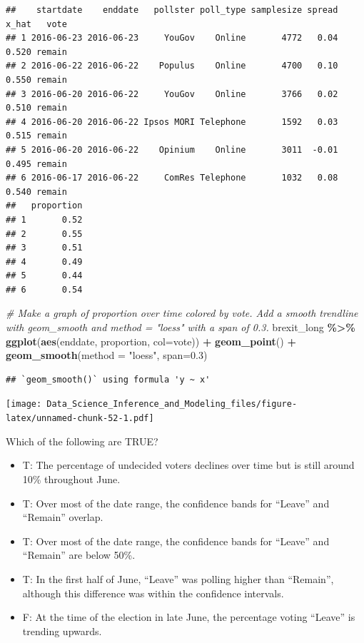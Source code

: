 \documentclass[
]{article}
\newenvironment{Shaded}{\begin{snugshade}}{\end{snugshade}}
\newcommand{\CommentTok}[1]{\textcolor[rgb]{0.56,0.35,0.01}{\textit{#1}}}
\newcommand{\DataTypeTok}[1]{\textcolor[rgb]{0.13,0.29,0.53}{#1}}
\newcommand{\FloatTok}[1]{\textcolor[rgb]{0.00,0.00,0.81}{#1}}
\newcommand{\KeywordTok}[1]{\textcolor[rgb]{0.13,0.29,0.53}{\textbf{#1}}}
\newcommand{\NormalTok}[1]{#1}
\newcommand{\OperatorTok}[1]{\textcolor[rgb]{0.81,0.36,0.00}{\textbf{#1}}}
\newcommand{\StringTok}[1]{\textcolor[rgb]{0.31,0.60,0.02}{#1}}
\providecommand{\tightlist}{%
  \setlength{\itemsep}{0pt}\setlength{\parskip}{0pt}}
\begin{document}
\begin{verbatim}
##    startdate    enddate   pollster poll_type samplesize spread x_hat   vote
## 1 2016-06-23 2016-06-23     YouGov    Online       4772   0.04 0.520 remain
## 2 2016-06-22 2016-06-22    Populus    Online       4700   0.10 0.550 remain
## 3 2016-06-20 2016-06-22     YouGov    Online       3766   0.02 0.510 remain
## 4 2016-06-20 2016-06-22 Ipsos MORI Telephone       1592   0.03 0.515 remain
## 5 2016-06-20 2016-06-22    Opinium    Online       3011  -0.01 0.495 remain
## 6 2016-06-17 2016-06-22     ComRes Telephone       1032   0.08 0.540 remain
##   proportion
## 1       0.52
## 2       0.55
## 3       0.51
## 4       0.49
## 5       0.44
## 6       0.54
\end{verbatim}

\begin{Shaded}
\begin{Highlighting}[]
\CommentTok{\# Make a graph of proportion over time colored by vote. Add a smooth trendline with geom\_smooth and method = "loess" with a span of 0.3.}
\NormalTok{brexit\_long }\OperatorTok{\%\textgreater{}\%}
\StringTok{  }\KeywordTok{ggplot}\NormalTok{(}\KeywordTok{aes}\NormalTok{(enddate, proportion, }\DataTypeTok{col=}\NormalTok{vote)) }\OperatorTok{+}
\StringTok{  }\KeywordTok{geom\_point}\NormalTok{() }\OperatorTok{+}
\StringTok{  }\KeywordTok{geom\_smooth}\NormalTok{(}\DataTypeTok{method =} \StringTok{"loess"}\NormalTok{, }\DataTypeTok{span=}\FloatTok{0.3}\NormalTok{)}
\end{Highlighting}
\end{Shaded}

\begin{verbatim}
## `geom_smooth()` using formula 'y ~ x'
\end{verbatim}

\texttt{[image: Data\_Science\_Inference\_and\_Modeling\_files/figure-latex/unnamed-chunk-52-1.pdf]}

Which of the following are TRUE?

\begin{itemize}
\tightlist
\item
  T: The percentage of undecided voters declines over time but is still
  around 10\% throughout June.
\item
  T: Over most of the date range, the confidence bands for ``Leave'' and
  ``Remain'' overlap.
\item
  T: Over most of the date range, the confidence bands for ``Leave'' and
  ``Remain'' are below 50\%.
\item
  T: In the first half of June, ``Leave'' was polling higher than
  ``Remain'', although this difference was within the confidence
  intervals.
\item
  F: At the time of the election in late June, the percentage voting
  ``Leave'' is trending upwards.
\end{itemize}
\end{document}
